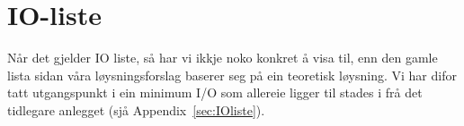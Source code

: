 \section{IO-liste}
\thispagestyle{fancy}

Når det gjelder \gls{IO} liste, så har vi ikkje noko konkret å visa til, enn den gamle lista sidan våra løysningsforslag baserer seg på ein teoretisk løysning.
Vi har difor tatt utgangspunkt i ein minimum I/O som allereie ligger til stades i frå det tidlegare anlegget (sjå Appendix~\ref{sec:IOliste}). 







\newpage

